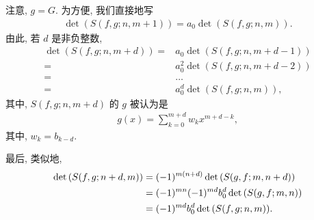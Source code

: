 \documentclass[../libro.tex]{subfiles}
\begin{document}
\begin{example}
    注意, \(g = G\).
    为方便, 我们直接地写
    \begin{align*}
        \det {(S(f, g; n, m+1))} = a_0 \det {(S(f, g; n, m))}.
    \end{align*}
    由此, 若 \(d\) 是非负整数,
    \begin{align*}
        \det {(S(f, g; n, m+d))}
        = {} & a_0 \det {(S(f, g; n, m+d-1))}   \\
        = {} & a_0^2 \det {(S(f, g; n, m+d-2))} \\
        = {} & \dots                            \\
        = {} & a_0^d \det {(S(f, g; n, m))},
    \end{align*}
    其中, \(S(f, g; n, m+d)\) 的 \(g\) 被认为是
    \begin{align*}
        g(x) = \sum_{k = 0}^{m+d} {w_k x^{m+d-k}},
    \end{align*}
    其中, \(w_k = b_{k-d}\).

    最后, 类似地,
    \begin{align*}
        \det {(S(f, g; n+d, m))}
        = {} &
        (-1)^{m (n+d)} \det {(S(g, f; m, n+d))}
        \\
        = {} &
        (-1)^{m n} (-1)^{m d} b_0^d \det {(S(g, f; m, n))}
        \\
        = {} &
        (-1)^{m d} b_0^d \det {(S(f, g; n, m))}.
        \qedhere
    \end{align*}
\end{example}
\end{document}
